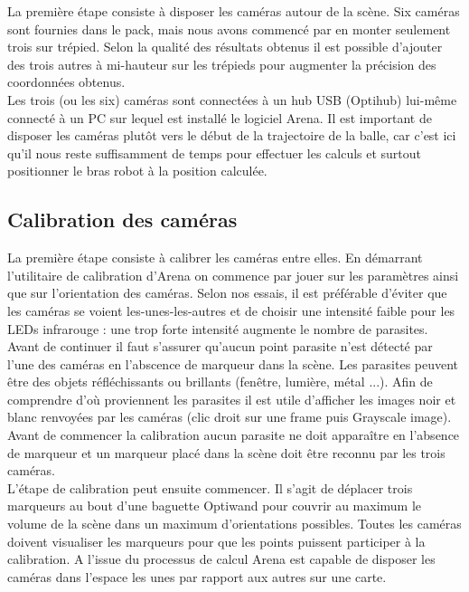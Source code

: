 \documentclass{article}[11pt]
\begin{document}
La première étape consiste à disposer les caméras autour de la scène. Six caméras sont fournies dans le pack, mais nous avons commencé par en monter seulement trois sur trépied. Selon la qualité des résultats obtenus il est possible d'ajouter des trois autres à mi-hauteur sur les trépieds pour augmenter la précision des coordonnées obtenus. \\

Les trois (ou les six) caméras sont connectées à un hub USB (Optihub) lui-même connecté à un PC sur lequel est installé le logiciel Arena. Il est important de disposer les caméras plutôt vers le début de la trajectoire de la balle, car c'est ici qu'il nous reste suffisamment de temps pour effectuer les calculs et surtout positionner le bras robot à la position calculée. \\

\subsection{Calibration des caméras}

La première étape consiste à calibrer les caméras entre elles. En démarrant l'utilitaire de calibration d'Arena on commence par jouer sur les paramètres ainsi que sur l'orientation des caméras. Selon nos essais, il est préférable d'éviter que les caméras se voient les-unes-les-autres et de choisir une intensité faible pour les LEDs infrarouge : une trop forte intensité augmente le nombre de parasites. Avant de continuer il faut s'assurer qu'aucun point parasite n'est détecté par l'une des caméras en l'abscence de marqueur dans la scène. Les parasites peuvent être des objets réfléchissants ou brillants (fenêtre, lumière, métal ...). Afin de comprendre d'où proviennent les parasites il est utile d'afficher les images noir et blanc renvoyées par les caméras (clic droit sur une frame puis Grayscale image). Avant de commencer la calibration aucun parasite ne doit apparaître en l'absence de marqueur et un marqueur placé dans la scène doit être reconnu par les trois caméras. \\

L'étape de calibration peut ensuite commencer. Il s'agit de déplacer trois marqueurs au bout d'une baguette Optiwand pour couvrir au maximum le volume de la scène dans un maximum d'orientations possibles. Toutes les caméras doivent visualiser les marqueurs pour que les points puissent participer à la calibration. A l'issue du processus de calcul Arena est capable de disposer les caméras dans l'espace les unes par rapport aux autres sur une carte. \\
\end{document}
